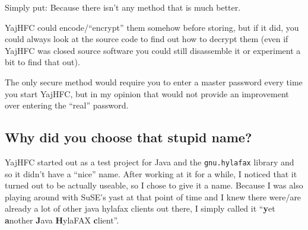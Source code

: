 \documentclass[a4paper,10pt]{scrartcl}
\begin{document}
Simply put: Because there isn't any method that is much better.

YajHFC could encode/``encrypt'' them somehow before storing, but if it did, 
you could always look at the source code to find out how to decrypt them
(even if YajHFC was closed source software you could still disassemble it
or experiment a bit to find that out).

The only secure method would require you to enter a master password every time
you start YajHFC, but in my opinion that would not provide an improvement over
entering the ``real'' password.


\subsection{Why did you choose that stupid name?}

YajHFC started out as a test project for Java and the \texttt{gnu.hylafax} library and so
it didn't have a ``nice'' name. After working at it for a while, I noticed that it turned 
out to be actually useable, so I chose to give it a name.
Because I was also playing around with SuSE's yast at that point of time and I knew there
were/are already a lot of other java hylafax clients out there, I simply called it
``\textbf{y}et \textbf{a}nother \textbf{J}ava \textbf{H}ylaFAX \textbf{c}lient''. 
\end{document}
